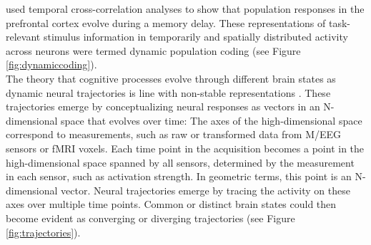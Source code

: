 \citet{stokes2013dynamic} used temporal cross-correlation analyses to show that population responses in the prefrontal cortex evolve during a memory delay.
These representations of task-relevant stimulus information in temporarily and spatially distributed activity across neurons were termed dynamic population coding \citep{sreenivasan2014revisiting} (see Figure \ref{fig:dynamiccoding}).\\
The theory that cognitive processes evolve through different brain states as dynamic neural trajectories is line with non-stable representations \citep{buonomano2009state}.
These trajectories emerge by conceptualizing neural responses as vectors in an N-dimensional space that evolves over time:
The axes of the high-dimensional space correspond to measurements, such as raw or transformed data from M/EEG sensors or \gls{fMRI} voxels.
Each time point in the acquisition becomes a point in the high-dimensional space spanned by all sensors, determined by the measurement in each sensor, such as activation strength.
In geometric terms, this point is an N-dimensional vector.
Neural trajectories emerge by tracing the activity on these axes over multiple time points.
Common or distinct brain states could then become evident as converging or diverging trajectories (see Figure \ref{fig:trajectories}).

